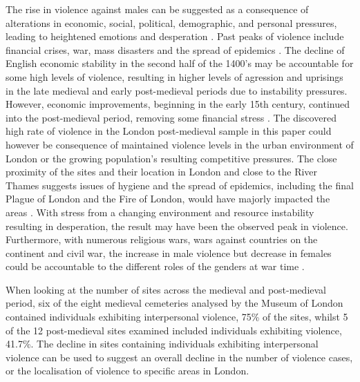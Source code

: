 The rise in violence against males can be suggested as a consequence of alterations in economic, social, political, demographic, and personal pressures, leading to heightened emotions and desperation \parencites{gurr1981}{krahn1986}. 
Past peaks of violence include financial crises, war, mass disasters and the spread of epidemics \parencite{stone1983}.  
The decline of English economic stability in the second half of the 1400’s may be accountable for some high levels of violence, resulting in higher levels of agression and uprisings in the late medieval and early post-medieval periods due to instability pressures. However, economic improvements, beginning in the early 15th century, continued into the post-medieval period, removing some financial stress \parencite{saltmarsh1941}. 
The discovered high rate of violence in the London post-medieval sample in this paper could however be consequence of maintained violence levels in the urban environment of London or the growing population’s resulting competitive pressures. The close proximity of the sites and their location in London and close to the River Thames suggests issues of hygiene and the spread of epidemics, including the final Plague of London and the Fire of London, would have majorly impacted the areas \parencite{freestone2012}. 
With stress from a changing environment and resource instability resulting in desperation, the result may have been the observed peak in violence. Furthermore, with numerous religious wars, wars against countries on the continent and civil war, the increase in male violence but decrease in females could be accountable to the different roles of the genders at war time \parencites{gurr1981}{krahn1986}. 

When looking at the number of sites across the medieval and post-medieval period, six of the eight medieval cemeteries analysed by the Museum of London contained individuals exhibiting interpersonal violence, 75\% of the sites, whilst 5 of the 12 post-medieval sites examined included individuals exhibiting violence, 41.7\%. The decline in sites containing individuals exhibiting interpersonal violence can be used to suggest an overall decline in the number of violence cases, or the localisation of violence to specific areas in London.



